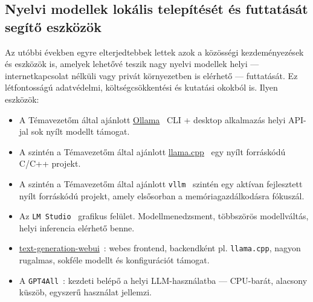 \documentclass[12pt]{report}
\begin{document}
    \subsection{Nyelvi modellek lokális telepítését és futtatását segítő eszközök}
    Az utóbbi években egyre elterjedtebbek lettek azok a közösségi kezdeményezések és eszközök is, amelyek lehetővé teszik nagy nyelvi modellek helyi — internetkapcsolat nélküli vagy privát környezetben is elérhető — futtatását.
    Ez létfontosságú adatvédelmi, költségcsökkentési és kutatási okokból is.
    Ilyen eszközök:
    \begin{itemize}
        \item A Témavezetőm által ajánlott  \href{https://ollama.com/}{Ollama}~\cite{ollama} CLI + desktop alkalmazás helyi API-jal sok nyílt modellt támogat.
        \item A szintén a Témavezetőm által ajánlott \href{https://github.com/ggml-org/llama.cpp}{llama.cpp}~\cite{llama_cpp} egy nyílt forráskódú C/C++ projekt.
        \item A szintén a Témavezetőm által ajánlott \texttt{\allowbreak vllm}~\cite{kwon2023efficient} szintén egy aktívan fejlesztett nyílt forráskódú projekt, amely elsősorban a memóriagazdálkodásra fókuszál.
        \item Az \texttt{\allowbreak LM Studio}~\cite{lmstudio} grafikus felület.
        Modellmenedzsment, többszörös modellváltás, helyi inferencia elérhető benne.
        \item \href{https://github.com/oobabooga/text-generation-webui}{text-generation-webui}~\cite{textgen_webui}: webes frontend, backendként pl. \texttt{\allowbreak llama.cpp}, nagyon rugalmas, sokféle modellt és konfigurációt támogat.
        \item A \texttt{\allowbreak GPT4All}~\cite{gpt4all}: kezdeti belépő a helyi LLM-használatba — CPU-barát, alacsony küszöb, egyszerű használat jellemzi.
    \end{itemize}
\end{document}
